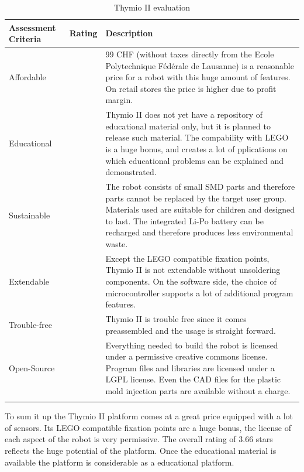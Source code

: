 \begin{longtabu} to \textwidth { X[1,l] X[1,l] X[4,l]}
\toprule
Assessment Criteria    & Rating & Description \\
\midrule
Affordable  &     & 99 CHF (without taxes directly from the Ecole Polytechnique Fédérale de Lausanne) is a reasonable price for a robot with this huge amount of features. On retail stores the price is higher due to profit margin.\\
Educational &      & Thymio II does not yet have a repository of educational material only, but it is planned to release such material. The compability with LEGO is a huge bonus, and creates a lot of pplications on which educational problems can be explained and demonstrated.\\
Sustainable  &      & The robot consists of small SMD parts and therefore parts cannot be replaced by the target user group. Materials used are suitable for children and designed to last. The integrated Li-Po battery can be recharged and therefore produces less environmental waste.\\
Extendable &  & Except the LEGO compatible fixation points, Thymio II is not extendable without unsoldering components. On the software side, the choice of microcontroller supports a lot of additional program features.\\
Trouble-free &  & Thymio II is trouble free since it comes preassembled and the usage is straight forward.\\
Open-Source &  & Everything needed to build the robot is licensed under a permissive creative commons license. Program files and libraries are licensed under a LGPL license. Even the CAD files for the plastic mold injection parts are available without a charge.\\
\bottomrule
\caption{Thymio II evaluation}
\label{tbl:thymio_eval}
\end{longtabu}

To sum it up the Thymio II platform comes at a great price equipped with a lot of sensors. Its LEGO compatible fixation points are a huge bonus, the license of each aspect of the robot is very permissive. The overall rating of 3.66 stars reflects the huge potential of the platform. Once the educational material is available the platform is considerable as a educational platform.

